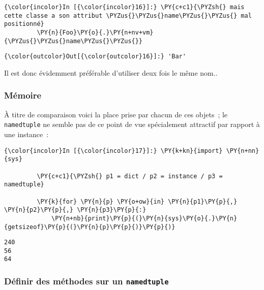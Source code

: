     \begin{Verbatim}[commandchars=\\\{\}]
{\color{incolor}In [{\color{incolor}16}]:} \PY{c+c1}{\PYZsh{} mais cette classe a son attribut \PYZus{}\PYZus{}name\PYZus{}\PYZus{} mal positionné}
         \PY{n}{Foo}\PY{o}{.}\PY{n+nv+vm}{\PYZus{}\PYZus{}name\PYZus{}\PYZus{}}
\end{Verbatim}


\begin{Verbatim}[commandchars=\\\{\}]
{\color{outcolor}Out[{\color{outcolor}16}]:} 'Bar'
\end{Verbatim}
            
    Il est donc évidemment préférable d'utiliser deux fois le même nom..

    \hypertarget{muxe9moire}{%
\subsubsection{Mémoire}\label{muxe9moire}}

    À titre de comparaison voici la place prise par chacun de ces objets~;
le \texttt{namedtuple} ne semble pas de ce point de vue spécialement
attractif par rapport à une instance~:

    \begin{Verbatim}[commandchars=\\\{\}]
{\color{incolor}In [{\color{incolor}17}]:} \PY{k+kn}{import} \PY{n+nn}{sys}
         
         \PY{c+c1}{\PYZsh{} p1 = dict / p2 = instance / p3 = namedtuple}
         
         \PY{k}{for} \PY{n}{p} \PY{o+ow}{in} \PY{n}{p1}\PY{p}{,} \PY{n}{p2}\PY{p}{,} \PY{n}{p3}\PY{p}{:}
             \PY{n+nb}{print}\PY{p}{(}\PY{n}{sys}\PY{o}{.}\PY{n}{getsizeof}\PY{p}{(}\PY{n}{p}\PY{p}{)}\PY{p}{)}
\end{Verbatim}


    \begin{Verbatim}[commandchars=\\\{\}]
240
56
64

    \end{Verbatim}

    \hypertarget{duxe9finir-des-muxe9thodes-sur-un-namedtuple}{%
\subsubsection{\texorpdfstring{Définir des méthodes sur un
\texttt{namedtuple}}{Définir des méthodes sur un namedtuple}}\label{duxe9finir-des-muxe9thodes-sur-un-namedtuple}}

